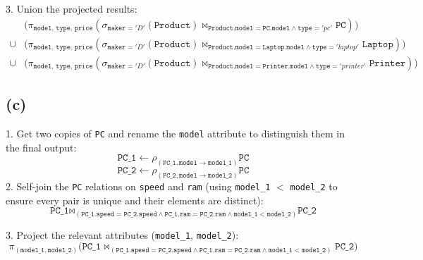 \documentclass{article}
\begin{document}
3. Union the projected results:
$$
    \begin{aligned}
             & \Big(\pi_{\texttt{model, type, price}}(\sigma_{\texttt{maker} = 'D'}(\texttt{Product}) \bowtie_{\texttt{Product.model} = \texttt{PC.model} \land \texttt{type} = 'pc'} \texttt{PC})
        \Big)                                                                                                                                                                                      \\
        \cup &
        \Big(
        \pi_{\texttt{model, type, price}}(\sigma_{\texttt{maker} = 'D'}(\texttt{Product}) \bowtie_{\texttt{Product.model} = \texttt{Laptop.model} \land \texttt{type} = 'laptop'} \texttt{Laptop})
        \Big)                                                                                                                                                                                      \\
        \cup &
        \Big(
        \pi_{\texttt{model, type, price}}(\sigma_{\texttt{maker} = 'D'}(\texttt{Product}) \bowtie_{\texttt{Product.model} = \texttt{Printer.model} \land \texttt{type} = 'printer'} \texttt{Printer})
        \Big)
    \end{aligned}
$$

\subsection*{(c)}
1. Get two copies of \texttt{PC} and rename the \texttt{model} attribute to distinguish them in the final output:
$$
    \texttt{PC\_1}\leftarrow\rho_{(\texttt{PC\_1},\texttt{model}\rightarrow \texttt{model\_1})}\texttt{PC}
$$
$$
    \texttt{PC\_2}\leftarrow\rho_{(\texttt{PC\_2},\texttt{model}\rightarrow \texttt{model\_2})}\texttt{PC}
$$
2. Self-join the \texttt{PC} relations on \texttt{speed} and \texttt{ram} (using \texttt{model\_1} $<$ \texttt{model\_2} to ensure every pair is unique and their elements are distinct):
$$
    \texttt{PC\_1} \bowtie_{(\texttt{PC\_1.speed} = \texttt{PC\_2.speed} \land \texttt{PC\_1.ram} = \texttt{PC\_2.ram} \land \texttt{model\_1} < \texttt{model\_2})} \texttt{PC\_2}
$$

3. Project the relevant attributes (\texttt{model\_1}, \texttt{model\_2}):
$$
    \pi_{(\texttt{model\_1}, \texttt{model\_2})} \Big(\texttt{PC\_1} \bowtie_{(\texttt{PC\_1.speed} = \texttt{PC\_2.speed} \land \texttt{PC\_1.ram} = \texttt{PC\_2.ram} \land \texttt{model\_1} < \texttt{model\_2})} \texttt{PC\_2}
    \Big)
$$
\end{document}
